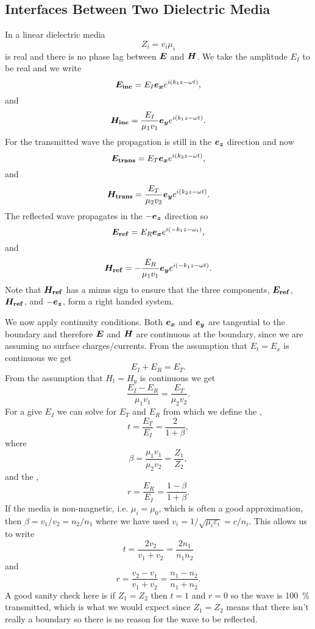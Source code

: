     \subsection{Interfaces Between Two Dielectric Media}
    In a linear dielectric media
    \[Z_i = v_i\mu_i\]
    is real and there is no phase lag between \(\bm{E}\) and \(\bm{H}\).
    We take the amplitude \(E_I\) to be real and we write
    \[\bm{E_{\mathrm{inc}}} = E_I\bm{e_{x}}e^{i(k_1z - \omega t)},\]
    and
    \[\bm{H_{\mathrm{inc}}} = \frac{E_I}{\mu_1v_1}\bm{e_{y}}e^{i(k_1z - \omega t)}.\]
    For the transmitted wave the propagation is still in the \(\bm{e_{z}}\) direction and now
    \[\bm{E_{\mathrm{trans}}} = E_T\bm{e_{x}}e^{i(k_2z - \omega t)},\]
    and
    \[\bm{H_{\mathrm{trans}}} = \frac{E_T}{\mu_2v_2}\bm{e_{y}}e^{i(k_2z - \omega t)}.\]
    The reflected wave propagates in the \(-\bm{e_{z}}\) direction so
    \[\bm{E_{\mathrm{ref}}} = E_R\bm{e_{x}}e^{i(-k_1z - \omega_t)},\]
    and
    \[\bm{H_{\mathrm{ref}}} = -\frac{E_R}{\mu_1v_1}\bm{e_{y}}e^{i(-k_1z - \omega t)}.\]
    Note that \(\bm{H_{\mathrm{ref}}}\) has a minus sign to ensure that the three components, \(\bm{E_{\mathrm{ref}}}\), \(\bm{H_{\mathrm{ref}}}\), and \(-\bm{e_{z}}\), form a right handed system.
    
    We now apply continuity conditions.
    Both \(\bm{e_{x}}\) and \(\bm{e_{y}}\) are tangential to the boundary and therefore \(\bm{E}\) and \(\bm{H}\) are continuous at the boundary, since we are assuming no surface charges/currents.
    From the assumption that \(E_t = E_x\) is continuous we get
    \[E_I + E_R = E_T.\]
    From the assumption that \(H_t = H_y\) is continuous we get
    \[\frac{E_I - E_R}{\mu_1v_1} = \frac{E_T}{\mu_2v_2}.\]
    For a give \(E_I\) we can solve for \(E_T\) and \(E_R\) from which we define the ,
    \[t = \frac{E_T}{E_I} = \frac{2}{1 + \beta},\]
    where
    \[\beta = \frac{\mu_1v_1}{\mu_2v_2} = \frac{Z_1}{Z_2},\]
    and the ,
    \[r = \frac{E_R}{E_I} = \frac{1 - \beta}{1 + \beta}.\]
    If the media is non-magnetic, i.e. \(\mu_i = \mu_0\), which is often a good approximation, then \(\beta = v_1/v_2 = n_2/n_1\) where we have used \(v_i = 1/\sqrt{\mu_i\varepsilon_i} = c/n_i\).
    This allows us to write
    \[t = \frac{2v_2}{v_1 + v_2} = \frac{2n_1}{n_1 n_2}\]
    and
    \[r = \frac{v_2 - v_1}{v_1 + v_2} = \frac{n_1 - n_2}{n_1 + n_2}.\]
    A good sanity check here is if \(Z_1 = Z_2\) then \(t = 1\) and \(r = 0\) so the wave is \SI{100}{\percent} transmitted, which is what we would expect since \(Z_1 = Z_2\) means that there isn't really a boundary so there is no reason for the wave to be reflected.
    

